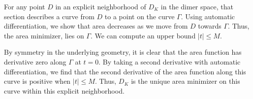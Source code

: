 For any point $D$ in an explicit neighborhood of $D_K$ in the dimer space, that section describes a curve from $D$ to a point
on the curve $\Gamma$.  
Using automatic differentiation, we show that area decreases as we move from $D$ towards $\Gamma$.
Thus, the area minimizer, lies on $\Gamma$.  We can compute an upper bound $|t|\le M$.

By symmetry in the underlying geometry, 
it is clear that the area function has derivative zero along $\Gamma$ at
$t=0$. By taking a second derivative with automatic differentiation, we find that the second derivative of
the area function along this curve is positive
when  $|t|\le M$.   Thus, $D_K$ is the unique area minimizer on this curve within this explicit neighborhood.


